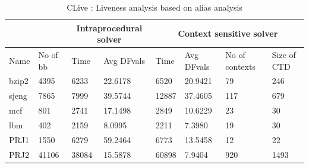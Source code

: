 \documentclass[12pt]{report}
\begin{document}
\begin {table}[H]
\label{tab:specclive} 
\begin{flushleft}
\begin{tabular}{|l | l | l | p{2.3cm} | l | p{2.3cm} | p{1.4cm} | p{1.2cm} | }
  \hline                        
  \multicolumn{2}{|c|}{} &
  \multicolumn{2}{|c|}{Intraprocedural solver} &
  \multicolumn{4}{|c|}{Context sensitive solver} \\
  \hline
  Name & No of bb &Time & Avg DFvals &  Time  & Avg DFvals    & No of \newline contexts  & Size of \newline CTD \\  \hline  
  bzip2& 4395     &6233 &  22.6178   & 6520   & 20.9421       & 79                       & 246                  \\ \hline  
  sjeng& 7865     &7999 &  39.5744   & 12887  & 37.4605       & 117                      & 679                  \\  \hline  
  mcf  & 801      &2741 &  17.1498   & 2849   & 10.6229       & 23                       & 30                   \\  \hline
  lbm  & 402      &2159 &  8.0995    & 2211   & 7.3980        & 19                       & 30                   \\  \hline
  PRJ1 & 1550     &6279 &  59.2464   & 6773   & 13.5458       & 12                       & 22                   \\  \hline
  PRJ2 & 41106    &38084&  15.5878   & 60898  & 7.9404        & 920                      & 1493                 \\  \hline  

\end{tabular}
\end{flushleft}
\caption {CLive : Liveness analysis based on alias analysis}
\end {table}
\end{document}
